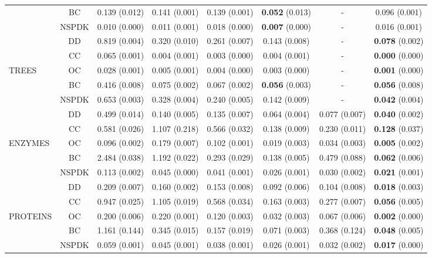 \begin{table}
\begin{tabular}{lccccccc}
          & BC             & 0.139 (0.012) & 0.141 (0.001) & 0.139 (0.001) & \textbf{0.052} (0.013) & - & 0.096 (0.001)\\
          & NSPDK          & 0.010 (0.000) & 0.011 (0.001) & 0.018 (0.000) & \textbf{0.007} (0.000) & - & 0.016 (0.001)\\
        \midrule
          & DD             & 0.819 (0.004) & 0.320 (0.010) & 0.261 (0.007) & 0.143 (0.008) & - & \textbf{0.078} (0.002)\\
          & CC             & 0.065 (0.001) & 0.004 (0.001) & 0.003 (0.000) & 0.004 (0.001) & - & \textbf{0.000} (0.000)\\
TREES     & OC             & 0.028 (0.001) & 0.005 (0.001) & 0.004 (0.000) & 0.003 (0.000) & - & \textbf{0.001} (0.000)\\
          & BC             & 0.416 (0.008) & 0.075 (0.002) & 0.067 (0.002) & \textbf{0.056} (0.003) & - & \textbf{0.056} (0.008)\\
          & NSPDK          & 0.653 (0.003) & 0.328 (0.004) & 0.240 (0.005) & 0.142 (0.009) & - & \textbf{0.042} (0.004)\\
        \midrule
          & DD             & 0.499 (0.014) & 0.140 (0.005) & 0.135 (0.007) & 0.064 (0.004) & 0.077 (0.007) & \textbf{0.040} (0.002)\\
          & CC             & 0.581 (0.026) & 1.107 (0.218) & 0.566 (0.032) & 0.138 (0.009) & 0.230 (0.011) & \textbf{0.128} (0.037)\\
ENZYMES   & OC             & 0.096 (0.002) & 0.179 (0.007) & 0.102 (0.001) & 0.019 (0.003) & 0.034 (0.003) & \textbf{0.005} (0.002)\\
          & BC             & 2.484 (0.038) & 1.192 (0.022) & 0.293 (0.029) & 0.138 (0.005) & 0.479 (0.088) & \textbf{0.062} (0.006)\\
          & NSPDK          & 0.113 (0.002) & 0.045 (0.000) & 0.041 (0.001) & 0.026 (0.001) & 0.030 (0.002) & \textbf{0.021} (0.001)\\
        \midrule
          & DD             & 0.209 (0.007) & 0.160 (0.002) & 0.153 (0.008) & 0.092 (0.006) & 0.104 (0.008) & \textbf{0.018} (0.003)\\
          & CC             & 0.947 (0.025) & 1.105 (0.019) & 0.568 (0.034) & 0.163 (0.003) & 0.277 (0.007) & \textbf{0.056} (0.005)\\
PROTEINS  & OC             & 0.200 (0.006) & 0.220 (0.001) & 0.120 (0.003) & 0.032 (0.003) & 0.067 (0.006) & \textbf{0.002} (0.000)\\
          & BC             & 1.161 (0.144) & 0.345 (0.015) & 0.157 (0.019) & 0.071 (0.003) & 0.368 (0.124) & \textbf{0.048} (0.005)\\
          & NSPDK          & 0.059 (0.001) & 0.045 (0.001) & 0.038 (0.001) & 0.026 (0.001) & 0.032 (0.002) & \textbf{0.017} (0.000)\\
        \bottomrule
    \end{tabular}
\end{table}